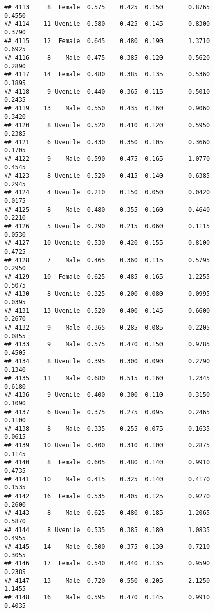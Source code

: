 \documentclass[
]{article}
\begin{document}
\begin{verbatim}
## 4113     8  Female  0.575    0.425  0.150       0.8765         0.4550
## 4114    11 Uvenile  0.580    0.425  0.145       0.8300         0.3790
## 4115    12  Female  0.645    0.480  0.190       1.3710         0.6925
## 4116     8    Male  0.475    0.385  0.120       0.5620         0.2890
## 4117    14  Female  0.480    0.385  0.135       0.5360         0.1895
## 4118     9 Uvenile  0.440    0.365  0.115       0.5010         0.2435
## 4119    13    Male  0.550    0.435  0.160       0.9060         0.3420
## 4120     8 Uvenile  0.520    0.410  0.120       0.5950         0.2385
## 4121     6 Uvenile  0.430    0.350  0.105       0.3660         0.1705
## 4122     9    Male  0.590    0.475  0.165       1.0770         0.4545
## 4123     8 Uvenile  0.520    0.415  0.140       0.6385         0.2945
## 4124     4 Uvenile  0.210    0.150  0.050       0.0420         0.0175
## 4125     8    Male  0.480    0.355  0.160       0.4640         0.2210
## 4126     5 Uvenile  0.290    0.215  0.060       0.1115         0.0530
## 4127    10 Uvenile  0.530    0.420  0.155       0.8100         0.4725
## 4128     7    Male  0.465    0.360  0.115       0.5795         0.2950
## 4129    10  Female  0.625    0.485  0.165       1.2255         0.5075
## 4130     8 Uvenile  0.325    0.200  0.080       0.0995         0.0395
## 4131    13 Uvenile  0.520    0.400  0.145       0.6600         0.2670
## 4132     9    Male  0.365    0.285  0.085       0.2205         0.0855
## 4133     9    Male  0.575    0.470  0.150       0.9785         0.4505
## 4134     8 Uvenile  0.395    0.300  0.090       0.2790         0.1340
## 4135    11    Male  0.680    0.515  0.160       1.2345         0.6180
## 4136     9 Uvenile  0.400    0.300  0.110       0.3150         0.1090
## 4137     6 Uvenile  0.375    0.275  0.095       0.2465         0.1100
## 4138     8    Male  0.335    0.255  0.075       0.1635         0.0615
## 4139    10 Uvenile  0.400    0.310  0.100       0.2875         0.1145
## 4140     8  Female  0.605    0.480  0.140       0.9910         0.4735
## 4141    10    Male  0.415    0.325  0.140       0.4170         0.1535
## 4142    16  Female  0.535    0.405  0.125       0.9270         0.2600
## 4143     8    Male  0.625    0.480  0.185       1.2065         0.5870
## 4144     8 Uvenile  0.535    0.385  0.180       1.0835         0.4955
## 4145    14    Male  0.500    0.375  0.130       0.7210         0.3055
## 4146    17  Female  0.540    0.440  0.135       0.9590         0.2385
## 4147    13    Male  0.720    0.550  0.205       2.1250         1.1455
## 4148    16    Male  0.595    0.470  0.145       0.9910         0.4035

\end{verbatim}
\end{document}
